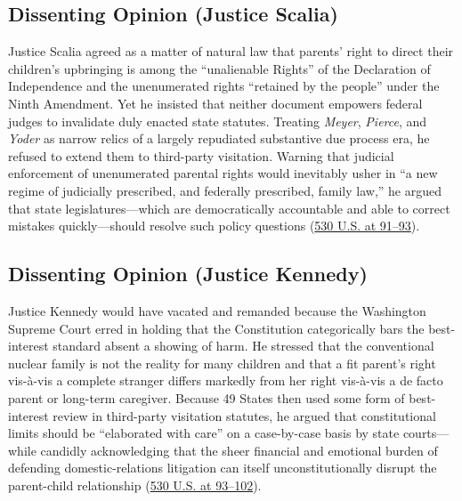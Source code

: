 \documentclass[12pt]{article}
\begin{document}
\subsection{Dissenting Opinion (Justice Scalia)}
Justice Scalia agreed as a matter of natural law that parents' right to direct their children's upbringing is among the ``unalienable Rights'' of the Declaration of Independence and the unenumerated rights ``retained by the people'' under the Ninth Amendment. Yet he insisted that neither document empowers federal judges to invalidate duly enacted state statutes. Treating \textit{Meyer}, \textit{Pierce}, and \textit{Yoder} as narrow relics of a largely repudiated substantive due process era, he refused to extend them to third-party visitation. Warning that judicial enforcement of unenumerated parental rights would inevitably usher in ``a new regime of judicially prescribed, and federally prescribed, family law,'' he argued that state legislatures---which are democratically accountable and able to correct mistakes quickly---should resolve such policy questions (\href{https://www.law.cornell.edu/supremecourt/text/99-138}{530 U.S. at 91--93}).

\subsection{Dissenting Opinion (Justice Kennedy)}
Justice Kennedy would have vacated and remanded because the Washington Supreme Court erred in holding that the Constitution categorically bars the best-interest standard absent a showing of harm. He stressed that the conventional nuclear family is not the reality for many children and that a fit parent's right vis-\`{a}-vis a complete stranger differs markedly from her right vis-\`{a}-vis a de facto parent or long-term caregiver. Because 49 States then used some form of best-interest review in third-party visitation statutes, he argued that constitutional limits should be ``elaborated with care'' on a case-by-case basis by state courts---while candidly acknowledging that the sheer financial and emotional burden of defending domestic-relations litigation can itself unconstitutionally disrupt the parent-child relationship (\href{https://www.law.cornell.edu/supremecourt/text/99-138}{530 U.S. at 93--102}).
\end{document}
